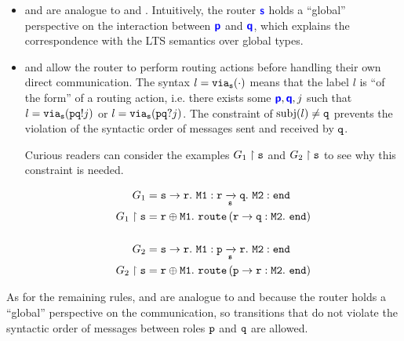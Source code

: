 \begin{itemize}

\item {} and  are
analogue to  and .
Intuitively, the router $\role{s}$ holds a
``global'' perspective on the interaction
between $\role{p}$ and $\role{q}$, which explains
the correspondence with the LTS semantics over global
types.

\item {} and  allow
the router to perform routing actions before handling
their own direct communication. The syntax $l = \via{s}{\cdot}$
means that the label $l$ is ``of the form'' of a routing
action, i.e. there exists some $\role{p}, \role{q}, j$
such that $l = \via{s}{\aout{p}{q}{j}}$ or 
$l = \via{s}{\ain{p}{q}{j}}$.
The constraint of $\subj{l} \neq \mrole{q}$
prevents the violation of the syntactic order of messages
sent and received by $\mrole{q}$.

Curious readers can consider the examples 
$\proj{G_1}{s}$ and $\proj{G_2}{s}$
to see why this constraint is needed.

\begin{align*}
G_1 &= \gcommone{s}{r}{\tmsg{M1}} \grouteone{r}{q}{s}{\tmsg{M2}} \tend \\
\proj{G_1}{s} &= \tselone{r}{\tmsg{M1}}. ~ 
	\routerone{r}{q}{\tmsg{M2}}{\tend} \\~\\
G_2 &= \gcommone{s}{r}{\tmsg{M1}} \grouteone{p}{r}{s}{\tmsg{M2}} \tend \\
\proj{G_2}{s} &= \tselone{r}{\tmsg{M1}}. ~ 
	\routerone{p}{r}{\tmsg{M2}}{\tend} \\
\end{align*}

\end{itemize}

As for the remaining rules,
 and  are analogue to
 and  because the router
holds a ``global'' perspective on the communication,
so transitions that do not violate the syntactic order
of messages between roles $\mrole{p}$ and $\mrole{q}$
are allowed.
